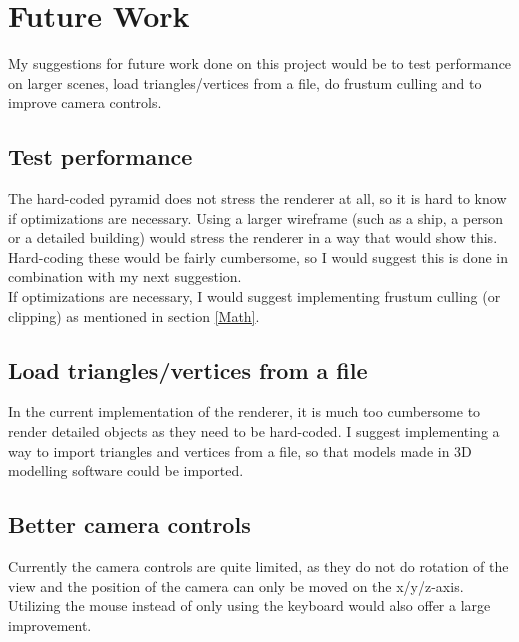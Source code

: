 \section{Future Work} 
My suggestions for future work done on this project would be to test performance on larger scenes, load triangles/vertices from a file, do frustum culling and to improve camera controls.
\subsection{Test performance}
The hard-coded pyramid does not stress the renderer at all, so it is hard to know if optimizations are necessary. Using a larger wireframe (such as a ship, a person or a detailed building) would stress the renderer in a way that would show this. Hard-coding these would be fairly cumbersome, so I would suggest this is done in combination with my next suggestion.
\\If optimizations are necessary, I would suggest implementing frustum culling (or clipping) as mentioned in section \ref{Math}.
\subsection{Load triangles/vertices from a file}
In the current implementation of the renderer, it is much too cumbersome to render detailed objects as they need to be hard-coded. I suggest implementing a way to import triangles and vertices from a file, so that models made in 3D modelling software could be imported.
\subsection{Better camera controls}
Currently the camera controls are quite limited, as they do not do rotation of the view and the position of the camera can only be moved on the x/y/z-axis. Utilizing the mouse instead of only using the keyboard would also offer a large improvement.